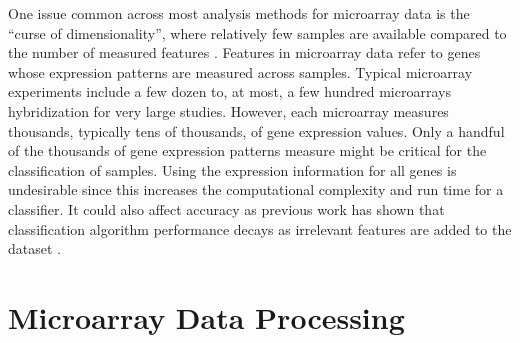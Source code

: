 

One issue common across most analysis methods for microarray data is the
``curse of dimensionality'', where relatively few samples are available
compared to the number of measured features \cite{Bellman_1957}.
Features in microarray data refer to genes whose expression patterns are
measured across samples.  Typical microarray experiments include a few dozen
to, at most, a few hundred microarrays hybridization for very large studies.
However, each microarray measures thousands, typically tens of thousands, of
gene expression values.  Only a handful of the thousands of gene expression
patterns measure might be critical for the classification of samples.  Using
the expression information for all genes is undesirable since this increases
the computational complexity and run time for a classifier.  It could also
affect accuracy as previous work has shown that classification algorithm
performance decays as irrelevant features are added to the dataset
\cite{john94irrelevant}. 






\section{Microarray Data Processing}

